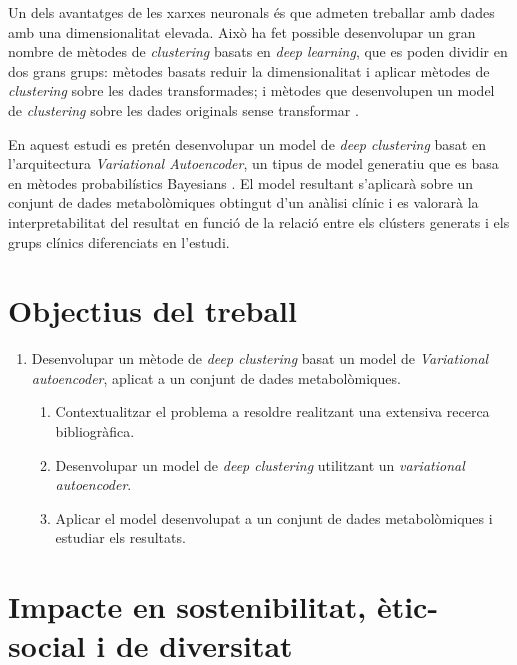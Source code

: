 \documentclass[CAT,BIB]{TFUOC}%
\begin{document}
        Un dels avantatges de les xarxes neuronals és que admeten treballar amb dades amb una dimensionalitat elevada. Això ha fet possible desenvolupar un gran nombre de mètodes de \textit{clustering} basats en \textit{deep learning}, que es poden dividir en dos grans grups: mètodes basats reduir la dimensionalitat i aplicar mètodes de \textit{clustering} sobre les dades transformades; i mètodes que desenvolupen un model de \textit{clustering} sobre les dades originals sense transformar \citep{Karim2021}.

        En aquest estudi es pretén desenvolupar un model de \textit{deep clustering} basat en l'arquitectura \textit{Variational Autoencoder}, un tipus de model generatiu que es basa en mètodes probabilístics Bayesians \citep{Kingma2019}. El model resultant s'aplicarà sobre un conjunt de dades metabolòmiques obtingut d'un anàlisi clínic i es valorarà la interpretabilitat del resultat en funció de la relació entre els clústers generats i els grups clínics diferenciats en l'estudi.

    \section{Objectius del treball}
    \label{s:objectius}

        \begin{enumerate}
            \item Desenvolupar un mètode de \textit{deep clustering} basat un model de \textit{Variational autoencoder}, aplicat a un conjunt de dades metabolòmiques.
            \begin{enumerate}
                \item Contextualitzar el problema a resoldre realitzant una extensiva recerca bibliogràfica.
                \item Desenvolupar un model de \textit{deep clustering} utilitzant un \textit{variational autoencoder}.
                \item Aplicar el model desenvolupat a un conjunt de dades metabolòmiques i estudiar els resultats.
            \end{enumerate}
        \end{enumerate}

    \section{Impacte en sostenibilitat, ètic-social i de diversitat}
    \label{s:etic}
\end{document}
